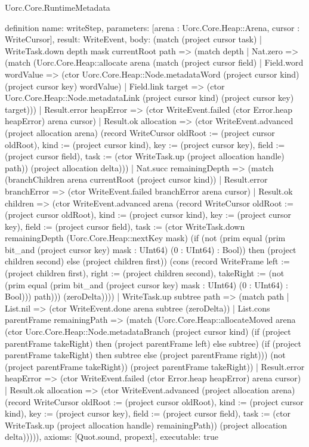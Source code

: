 \begin{lexlean}{Uorc.Core.RuntimeMetadata}
\begin{semanticmodule}
definition{
  name: writeStep,
  parameters: [arena : Uorc.Core.Heap::Arena, cursor : WriteCursor],
  result: WriteEvent,
  body: (match (project cursor task)
    | WriteTask.down depth mask currentRoot path => (match depth
      | Nat.zero => (match (Uorc.Core.Heap::allocate arena (match (project cursor field)
          | Field.word wordValue => (ctor Uorc.Core.Heap::Node.metadataWord (project cursor kind) (project cursor key) wordValue)
          | Field.link target => (ctor Uorc.Core.Heap::Node.metadataLink (project cursor kind) (project cursor key) target)))
        | Result.error heapError => (ctor WriteEvent.failed (ctor Error.heap heapError) arena cursor)
        | Result.ok allocation => (ctor WriteEvent.advanced (project allocation arena) (record WriteCursor {oldRoot := (project cursor oldRoot), kind := (project cursor kind), key := (project cursor key), field := (project cursor field), task := (ctor WriteTask.up (project allocation handle) path)}) (project allocation delta)))
      | Nat.succ remainingDepth => (match (branchChildren arena currentRoot (project cursor kind))
        | Result.error branchError => (ctor WriteEvent.failed branchError arena cursor)
        | Result.ok children => (ctor WriteEvent.advanced arena (record WriteCursor {oldRoot := (project cursor oldRoot), kind := (project cursor kind), key := (project cursor key), field := (project cursor field), task := (ctor WriteTask.down remainingDepth (Uorc.Core.Heap::nextKey mask) (if (not (prim equal (prim bit_and (project cursor key) mask : UInt64) (0 : UInt64) : Bool)) then (project children second) else (project children first)) (cons (record WriteFrame {left := (project children first), right := (project children second), takeRight := (not (prim equal (prim bit_and (project cursor key) mask : UInt64) (0 : UInt64) : Bool))}) path))}) (zeroDelta))))
    | WriteTask.up subtree path => (match path
      | List.nil => (ctor WriteEvent.done arena subtree (zeroDelta))
      | List.cons parentFrame remainingPath => (match (Uorc.Core.Heap::allocateMoved arena (ctor Uorc.Core.Heap::Node.metadataBranch (project cursor kind) (if (project parentFrame takeRight) then (project parentFrame left) else subtree) (if (project parentFrame takeRight) then subtree else (project parentFrame right))) (not (project parentFrame takeRight)) (project parentFrame takeRight))
        | Result.error heapError => (ctor WriteEvent.failed (ctor Error.heap heapError) arena cursor)
        | Result.ok allocation => (ctor WriteEvent.advanced (project allocation arena) (record WriteCursor {oldRoot := (project cursor oldRoot), kind := (project cursor kind), key := (project cursor key), field := (project cursor field), task := (ctor WriteTask.up (project allocation handle) remainingPath)}) (project allocation delta))))),
  axioms: [Quot.sound, propext],
  executable: true
}


\end{semanticmodule}
\end{lexlean}
